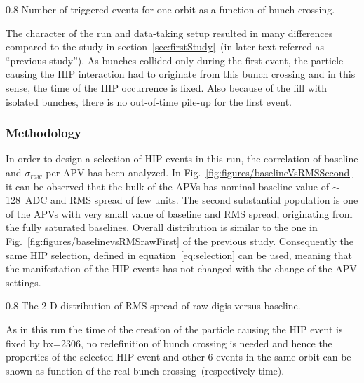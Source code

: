                  {0.8}       %
                 {Number of triggered events for one orbit as a function of bunch crossing.} %

The character of the run and data-taking setup resulted in many differences compared to the study in section~\ref{sec:firstStudy}~(in later text referred as ``previous study''). As bunches collided only during the first event, the particle causing the HIP interaction had to originate from this bunch crossing and in this sense, the time of the HIP occurrence is fixed. Also because of the fill with isolated bunches, there is no out-of-time pile-up for the first event.

\subsubsection{Methodology}

In order to design a selection of HIP events in this run, the correlation of baseline and $\sigma_{raw}$ per APV has been analyzed. In Fig.~\ref{fig:figures/baselineVsRMSSecond} it can be observed that the bulk of the APVs has nominal baseline value of $\sim$128~ADC and RMS spread of few units. The second substantial population is one of the APVs with very small value of baseline and RMS spread, originating from the fully saturated baselines. Overall distribution is similar to the one in Fig.~\ref{fig:figures/baselinevsRMSrawFirst} of the previous study. Consequently the same HIP selection, defined in equation~\ref{eq:selection} can be used, meaning that the manifestation of the HIP events has not changed with the change of the APV settings.

                 {0.8}       %
                 {The 2-D distribution of RMS spread of raw digis versus baseline. } %

As in this run the time of the creation of the particle causing the HIP event is fixed by bx=2306, no redefinition of bunch crossing is needed and hence the properties of the selected HIP event and other 6 events in the same orbit can be shown as function of the real bunch crossing~(respectively time).

